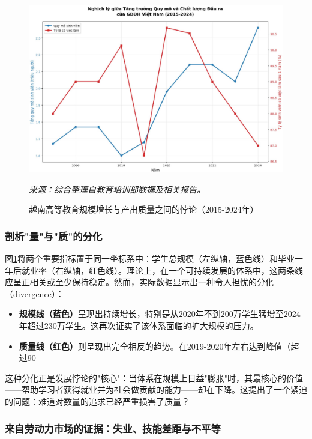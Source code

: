 \begin{figure}[h!]
    \centering
    \includegraphics[width=\textwidth]{image/nghich_ly_tang_truong_quy_mo_chat_luong.jpg}
    \caption{越南高等教育规模增长与产出质量之间的悖论（2015-2024年）}
    \label{fig:nghich_ly_quy_mo_chat_luong}
    \vspace{0.2cm}
    \footnotesize{\textit{来源：综合整理自教育培训部数据及相关报告。}}
\end{figure}

\subsubsection{剖析"量"与"质"的分化}

图\ref{fig:nghich_ly_quy_mo_chat_luong}将两个重要指标置于同一坐标系中：学生总规模（左纵轴，蓝色线）和毕业一年后就业率（右纵轴，红色线）。理论上，在一个可持续发展的体系中，这两条线应呈正相关或至少保持稳定。然而，实际数据显示出一种令人担忧的分化（divergence）：
\begin{itemize}
    \item \textbf{规模线（蓝色）}呈现出持续增长，特别是从2020年不到200万学生猛增至2024年超过230万学生。这再次证实了该体系面临的扩大规模的压力。
    \item \textbf{质量线（红色）}则呈现出完全相反的趋势。在2019-2020年左右达到峰值（超过90%
\end{itemize}
这种分化正是发展悖论的"核心"：当体系在规模上日益"膨胀"时，其最核心的价值——帮助学习者获得就业并为社会做贡献的能力——却在下降。这提出了一个紧迫的问题：难道对数量的追求已经严重损害了质量？

\subsubsection{来自劳动力市场的证据：失业、技能差距与不平等}

